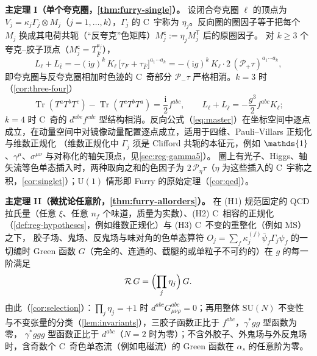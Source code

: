 \documentclass[UTF8,a4paper,11pt,fontset=fandol]{ctexart}
\let\amsmathbb\mathbb
\renewcommand{\mathbb}[1]{\ifx1#1\mathds{1}\else\amsmathbb{#1}\fi}
\theoremstyle{cplain}
\theoremstyle{cdefinition}
\theoremstyle{cremark}
\numberwithin{equation}{section}
\DeclareMathOperator{\Tr}{Tr}
\newcommand{\tp}{\mathsf{T}}                         %
\newcommand{\Rop}{\mathcal{R}}                       %
\newcommand{\Pp}{\mathcal{P}_{+}}                    %
\newcommand{\Pm}{\mathcal{P}_{-}}                    %
\newcommand{\ii}{\mathrm{i}}                        %
\begin{document}
\begin{tcolorbox}[enhanced,breakable,title=本文主要结果,fonttitle=\bfseries,
  colback=blue!2!white,colframe=blue!50!black,boxrule=0.7pt,arc=2pt,
  left=6pt,right=6pt,top=4pt,bottom=4pt,before skip=8pt,after skip=8pt]
\textbf{主定理 I（单个夸克圈，\cref{thm:furry-single}）。}
设闭合夸克圈 $\ell$ 的顶点为 $V_j=\kappa_j\Gamma_j\otimes M_j$（$j=1,\dots,k$），$\Gamma_j$ 的 C~宇称为 $\eta_j$。反向圈的圈因子等于把每个 $M_j$ 换成其电荷共轭（“反夸克”色矩阵）$M_j^{\mathsf c}:=\eta_jM_j^{\tp}$ 后的原圈因子。
对 $k\ge3$ 个夸克--胶子顶点（$M_j^{\mathsf c}=T^{a_j}_{\bar F}$），
\begin{equation*}
L_\ell+L_{\bar\ell}=-(\ii g)^k\,K_\ell\,\bigl[\tau_F+\tau_{\bar F}\bigr]^{a_1\cdots a_k}=-(\ii g)^k\,K_\ell\cdot2\,(\Pp\tau)^{a_1\cdots a_k},
\end{equation*}
即夸克圈与反夸克圈相加时色迹的 C~奇部分 $\Pm\tau$ 严格相消。$k=3$ 时（\cref{cor:three-four}）
\begin{equation*}
\Tr(T^aT^bT^c)-\Tr(T^cT^bT^a)=\frac{\ii}{2}f^{abc},\qquad L_\ell+L_{\bar\ell}=-\frac{g^3}{2}f^{abc}K_\ell ;
\end{equation*}
$k=4$ 时 C~奇的 $d^{abe}f^{cde}$ 型结构相消。反向公式（\cref{eq:master}）在坐标空间中逐点成立，在动量空间中对镜像动量配置逐点成立，适用于四维、Pauli--Villars 正规化与维数正规化
（维数正规化中 $\Gamma_j$ 须是 Clifford 共轭的本征元，例如 $\mathbb 1$、$\gamma^\mu$、$\sigma^{\mu\nu}$ 与对称化的轴矢顶点，见\cref{sec:reg-gamma5}）。
圈上有光子、Higgs、轴矢流等色单态插入时，两种取向之和的色因子为 $2\,\mathcal P_\eta\tau$（$\eta$ 为这些插入的 C~宇称之积，\cref{cor:singlet}）；$\mathrm U(1)$ 情形即 Furry 的原始定理（\cref{cor:qed}）。

\smallskip
\textbf{主定理 II（微扰论任意阶，\cref{thm:furry-allorders}）。}
在 (H1) 规范固定的 QCD 拉氏量（任意 $\xi$、任意 $n_f$ 个味道，质量为实数）、(H2) C~相容的正规化（\cref{def:reg-hypotheses}，例如维数正规化）与 (H3) C~不变的重整化（例如 $\overline{\mathrm{MS}}$）之下，
胶子场、鬼场、反鬼场与味对角的色单态算符 $O_j=\sum_f\kappa_j^{(f)}\bar\psi_f\Gamma_j\psi_f$ 的一切编时 Green 函数 $G$（完全的、连通的、截腿的或单粒子不可约的）在 $g$ 的每一阶满足
\begin{equation*}
\Rop\,G=\Bigl(\prod_{j}\eta_j\Bigr)\,G .
\end{equation*}
由此（\cref{cor:selection}）：$\prod_j\eta_j=+1$ 时 $d^{abc}G^{abc}_{\mu\nu\rho}=0$；再用整体 $\mathrm{SU}(N)$ 不变性与不变张量的分类（\cref{lem:invariants}），三胶子函数正比于 $f^{abc}$，$\gamma^*gg$ 型函数为零，
$\gamma^*ggg$ 型函数正比于 $d^{abc}$（$N=2$ 时为零）；不含外胶子、外鬼场与外反鬼场时，含奇数个 C~奇色单态流（例如电磁流）的 Green 函数在 $\alpha_s$ 的任意阶为零。


\end{tcolorbox}
\end{document}
